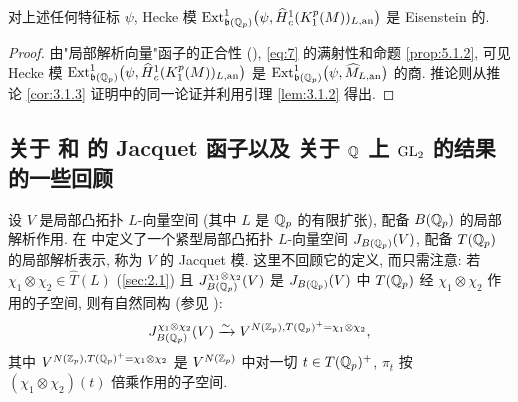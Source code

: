 \begin{corollary}\label{cor:5.1.3}
对上述任何特征标 $\psi$, Hecke 模 $\operatorname{Ext}_{\mathfrak{b}(\mathbb{Q}_p)}^{1}\bigl(\psi,\widehat{H}{}_{c}^{1}(K_1^{p}(M))_{L,\mathrm{an}}\bigr)$ 是 Eisenstein 的.
\end{corollary}

\begin{proof}
由"局部解析向量"函子的正合性 (\cite[Th.~7.1]{ref:45}), \eqref{eq:7} 的满射性和命题 \ref{prop:5.1.2}, 可见 Hecke 模 $\operatorname{Ext}_{\mathfrak{b}(\mathbb{Q}_p)}^{1}\bigl(\psi,\widehat{H}{}_{c}^{1}(K_1^{p}(M))_{L,\mathrm{an}}\bigr)$ 是 $\operatorname{Ext}_{\mathfrak{b}(\mathbb{Q}_p)}^{1}\bigl(\psi,\widehat{M}_{L,\mathrm{an}}\bigr)$ 的商.
推论则从推论 \ref{cor:3.1.3} 证明中的同一论证并利用引理 \ref{lem:3.1.2} 得出.
\end{proof}

\subsection{关于 \cite{ref:22} 和 \cite{ref:25} 的 Jacquet 函子以及 \cite{ref:24} 关于 $\mathbb{Q}$ 上 $\mathrm{GL}_2$ 的结果的一些回顾}

设 $V$ 是局部凸拓扑 $L$-向量空间 (其中 $L$ 是 $\mathbb{Q}_p$ 的有限扩张), 配备 $B(\mathbb{Q}_p)$ 的局部解析作用.
在 \cite[Def.~3.4.5]{ref:22} 中定义了一个紧型局部凸拓扑 $L$-向量空间 $J_{B(\mathbb{Q}_p)}(V)$, 配备 $T(\mathbb{Q}_p)$ 的局部解析表示, 称为 $V$ 的 Jacquet 模.
这里不回顾它的定义, 而只需注意: 若 $\chi_1 \otimes \chi_2 \in \widehat{T}(L)$ (\ref{sec:2.1}) 且 $J_{B(\mathbb{Q}_p)}^{\chi_1 \otimes \chi_2}(V)$ 是 $J_{B(\mathbb{Q}_p)}(V)$ 中 $T(\mathbb{Q}_p)$ 经 $\chi_1 \otimes \chi_2$ 作用的子空间, 则有自然同构 (参见 \cite[Prop.~3.4.9]{ref:22}):
\begin{equation}
\label{eq:27}
J_{B(\mathbb{Q}_p)}^{\chi_1 \otimes \chi_2}(V) \xrightarrow{\sim} V^{N(\mathbb{Z}_p),T(\mathbb{Q}_p)^{+} = \chi_1 \otimes \chi_2},
\end{equation}
其中 $V^{N(\mathbb{Z}_p),T(\mathbb{Q}_p)^{+} = \chi_1 \otimes \chi_2}$ 是 $V^{N(\mathbb{Z}_p)}$ 中对一切 $t \in T(\mathbb{Q}_p)^{+}$, $\pi_t$ 按 $(\chi_1 \otimes \chi_2)(t)$ 倍乘作用的子空间.


